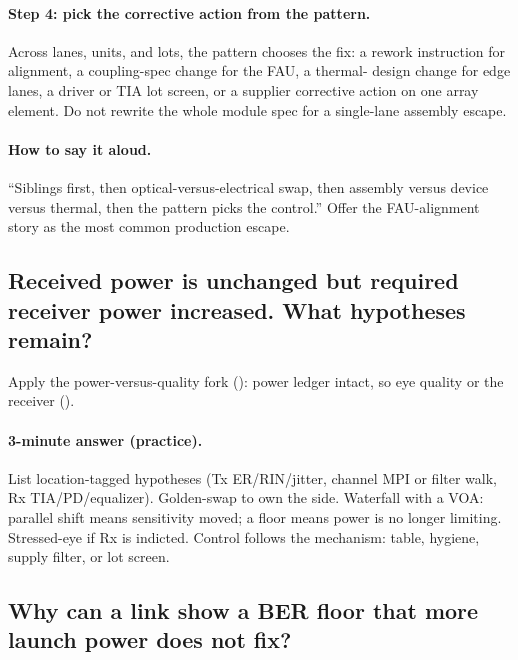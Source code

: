 \paragraph{Step 4: pick the corrective action from the pattern.}
Across lanes, units, and lots, the pattern chooses the fix: a rework
instruction for alignment, a coupling-spec change for the FAU, a thermal-
design change for edge lanes, a driver or TIA lot screen, or a supplier
corrective action on one array element. Do not rewrite the whole module
spec for a single-lane assembly escape.

\paragraph{How to say it aloud.}
``Siblings first, then optical-versus-electrical swap, then assembly versus
device versus thermal, then the pattern picks the control.'' Offer the
FAU-alignment story as the most common production escape.

\subsection{Received power is unchanged but required receiver power increased.
What hypotheses remain?}
\label{sec:interview-worked-sensitivity}

Apply the power-versus-quality fork (): power
ledger intact, so eye quality or the receiver ().


\paragraph{3-minute answer (practice).}
List location-tagged hypotheses (Tx ER/RIN/jitter, channel MPI
or filter walk, Rx TIA/PD/equalizer). Golden-swap to own the side. Waterfall
with a VOA: parallel shift means sensitivity moved; a floor
means power is no longer limiting. Stressed-eye if Rx is
indicted.
Control follows the mechanism: table, hygiene, supply filter, or lot screen.

\subsection{Why can a link show a BER floor that more launch power does not
fix?}
\label{sec:interview-worked-ber-floor}

